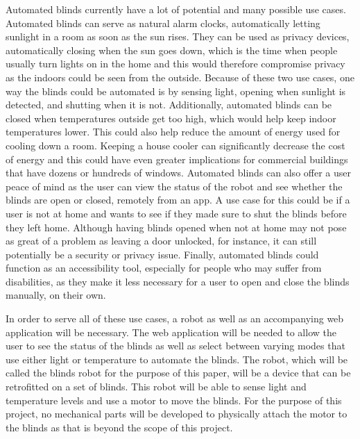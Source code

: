 \documentclass[10pt,twocolumn]{article}
\begin{document}
Automated blinds currently have a lot of potential and many possible use cases. Automated blinds can serve as natural alarm clocks, automatically letting sunlight in a room as soon as the sun rises. They can be used as privacy devices, automatically closing when the sun goes down, which is the time when people usually turn lights on in the home and this would therefore compromise privacy as the indoors could be seen from the outside. Because of these two use cases, one way the blinds could be automated is by sensing light, opening when sunlight is detected, and shutting when it is not. Additionally, automated blinds can be closed when temperatures outside get too high, which would help keep indoor temperatures lower. This could also help reduce the amount of energy used for cooling down a room. Keeping a house cooler can significantly decrease the cost of energy and this could have even greater implications for commercial buildings that have dozens or hundreds of windows. Automated blinds can also offer a user peace of mind as the user can view the status of the robot and see whether the blinds are open or closed, remotely from an app. A use case for this could be if a user is not at home and wants to see if they made sure to shut the blinds before they left home. Although having blinds opened when not at home may not pose as great of a problem as leaving a door unlocked, for instance, it can still potentially be a security or privacy issue. Finally, automated blinds could function as an accessibility tool, especially for people who may suffer from disabilities, as they make it less necessary for a user to open and close the blinds manually, on their own.

In order to serve all of these use cases, a robot as well as an accompanying web application will be necessary. The web application will be needed to allow the user to see the status of the blinds as well as select between varying modes that use either light or temperature to automate the blinds. The robot, which will be called the blinds robot for the purpose of this paper, will be a device that can be retrofitted on a set of blinds. This robot will be able to sense light and temperature levels and use a motor to move the blinds. For the purpose of this project, no mechanical parts will be developed to physically attach the motor to the blinds as that is beyond the scope of this project.
\end{document}
